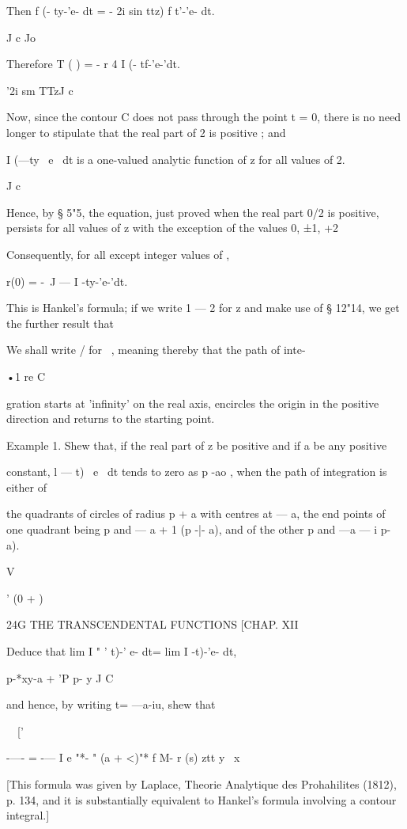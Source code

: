 Then f (- ty-'e- dt = - 2i sin ttz) f t'-'e- dt.

J c Jo

Therefore T ( ) = - r 4 I (- tf-'e-'dt.

'2i sm TTzJ c

Now, since the contour C does not pass through the point t = 0, there
is no need longer to stipulate that the real part of 2 is positive ;
and

I (—ty~ e~ dt is a one-valued analytic function of z for all values of
2.

J c

Hence, by § 5"5, the equation, just proved when the real part 0/2 is
positive, persists for all values of z with the exception of the
values 0, ±1, +2

Consequently, for all except integer values of ,

r(0) = -\ J — I -ty-'e-'dt.

This is Hankel's formula; if we write 1 — 2 for z and make use of §
12"14, we get the further result that

We shall write / for \ , meaning thereby that the path of inte-

•1 re C

gration starts at 'infinity' on the real axis, encircles the origin in
the positive direction and returns to the starting point.

Example 1. Shew that, if the real part of z be positive and if a be
any positive

constant, l — t)~ e~ dt tends to zero as p -ao , when the path of
integration is either of

the quadrants of circles of radius p + a with centres at — a, the end
points of one quadrant being p and — a + 1 (p -|- a), and of the other
p and —a — i p- a).

V

' (0 + )

24G THE TRANSCENDENTAL FUNCTIONS [CHAP. XII

Deduce that lim I " ' t)-' e- dt= lim I -t)-'e- dt,

p-*xy-a + 'P p- y J C

and hence, by writing t= —a-iu, shew that

\ \ ['

-—- = -— I e "*- " (a + <)"* f M- r (s) ztt y \ x

[This formula was given by Laplace, Theorie Analytique des
Prohahilites (1812), p. 134, and it is substantially equivalent to
Hankel's formula involving a contour integral.]

